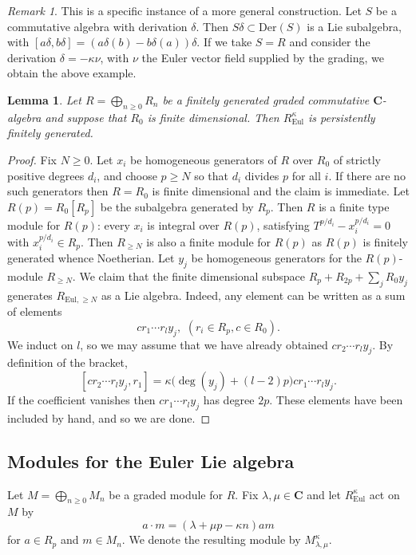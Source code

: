 \documentclass[12pt, oneside]{amsart}       %
\newtheorem{lemma}[theorem]{Lemma}
\theoremstyle{remark}
\newtheorem*{remark}{Remark}
\renewcommand{\geq}{\geqslant}
\begin{document}
\begin{remark} This is a specific instance of a more general construction. Let $S$ be a commutative algebra with derivation $\delta$. Then $S\delta\subset\mathrm{Der}(S)$ is a Lie subalgebra, with $[a\delta,b\delta]=(a\delta(b)-b\delta(a))\delta$. If we take $S=R$ and consider the derivation $\delta=-\kappa\nu$, with $\nu$ the Euler vector field supplied by the grading, we obtain the above example. \end{remark}

\begin{lemma}\label{euler algebra finite generation} Let $R=\bigoplus_{n\geq0}R_n$ be a finitely generated graded commutative $\mathbf C$-algebra and suppose that $R_0$ is finite dimensional. Then $R_{\mathrm{Eul}}^\kappa$ is persistently finitely generated.
\end{lemma} \begin{proof} Fix $N\geq0$. Let $x_i$ be homogeneous generators of $R$ over $R_0$ of strictly positive degrees $d_i$, and choose $p\geq N$ so that $d_i$ divides $p$ for all $i$. If there are no such generators then $R=R_0$ is finite dimensional and the claim is immediate. Let $R(p)=R_0[R_p]$ be the subalgebra generated by $R_p$. Then $R$ is a finite type module for $R(p)$: every $x_i$ is integral over $R(p)$, satisfying $T^{p/d_i}-x_i^{p/d_i}=0$ with $x_i^{p/d_i}\in R_p$. Then $R_{\geq N}$ is also a finite module for $R(p)$ as $R(p)$ is finitely generated whence Noetherian. Let $y_j$ be homogeneous generators for the $R(p)$-module $R_{\geq N}$. We claim that the finite dimensional subspace $R_p+R_{2p}+\sum_jR_0y_j$ generates $R_{\mathrm{Eul},\geq N}$ as a Lie algebra. Indeed, any element can be written as a sum of elements $$cr_1\cdots r_l y_j,\,\, (r_i\in R_p,c\in R_0).$$ We induct on $l$, so we may assume that we have already obtained $cr_2\cdots r_l y_j$. By definition of the bracket,
$$[cr_2\cdots r_l y_j,r_1]=\kappa\big(\deg(y_j)+(l-2)p\big)cr_1\cdots r_l y_j.$$
If the coefficient vanishes then $cr_1\cdots r_l y_j$ has degree $2p$. These elements have been included by hand, and so we are done. \end{proof}

\subsection{Modules for the Euler Lie algebra}

Let $M=\bigoplus_{n\geq0}M_n$ be a graded module for $R$. Fix $\lambda,\mu\in\mathbf C$ and let $R_{\mathrm{Eul}}^\kappa$ act on $M$ by $$a\cdot m=(\lambda+\mu p-\kappa n)am$$ for $a\in R_p$ and $m\in M_n.$ We denote the resulting module by $M_{\lambda,\mu}^\kappa$.
\end{document}

